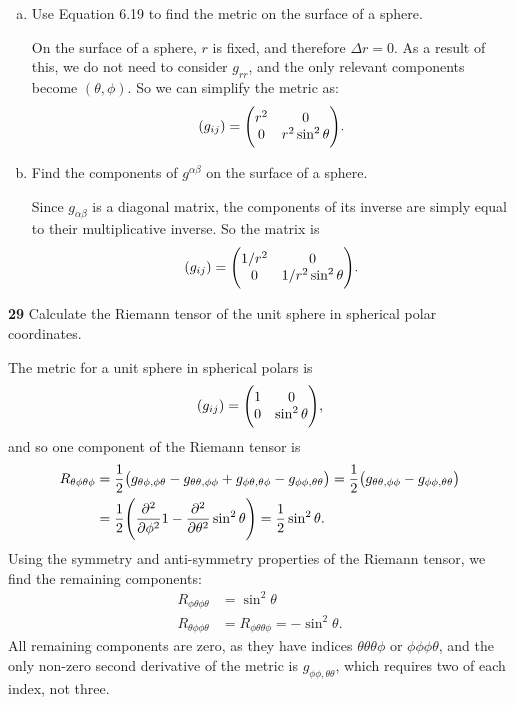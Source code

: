 \documentclass[gr-notes.tex]{subfiles}
\begin{document}
\begin{enumerate}[(a)]
\item Use Equation 6.19 to find the metric on the surface of a sphere.

On the surface of a sphere, $r$ is fixed, and therefore $\Delta r = 0$. As a result of this, we do not need to consider $g_{rr}$, and the only relevant components become $(\theta,\phi)$. So we can simplify the metric as:
%
\begin{displaymath}
  (g_{ij}) = \mqty(\dmat[0]{r^2,r^2\sin^2\theta}).
\end{displaymath}

\item Find the components of $g^{\alpha\beta}$ on the surface of a sphere.

Since $g_{\alpha\beta}$ is a diagonal matrix, the components of its inverse are simply equal to their multiplicative inverse. So the matrix is
%
\begin{displaymath}
  (g_{ij}) = \mqty(\dmat[0]{1/r^2,1/r^2\sin^2\theta}).
\end{displaymath}

\end{enumerate}


\textbf{29}
Calculate the Riemann tensor of the unit sphere in spherical polar coordinates.

The metric for a unit sphere in spherical polars is
%
\begin{displaymath}
  (g_{ij}) = \mqty(\dmat[0]{1,\sin^2\theta}),
\end{displaymath}
%
and so one component of the Riemann tensor is
%
\begin{align*}
  R_{\theta\phi\theta\phi} &=
  \frac{1}{2} \qty(
    g_{\theta\phi,\phi\theta} -
    g_{\theta\theta,\phi\phi} +
    g_{\phi\theta,\theta\phi} -
    g_{\phi\phi,\theta\theta}
  ) =
  \frac{1}{2} \qty(
    g_{\theta\theta,\phi\phi} -
    g_{\phi\phi,\theta\theta}
  )
  \\ &=
  \frac{1}{2} \qty(
    \pdv[2]{\phi}   1 -
    \pdv[2]{\theta} \sin^2\theta
  ) =
  \frac{1}{2} \sin^2\theta.
\end{align*}
%
Using the symmetry and anti-symmetry properties of the Riemann tensor, we find the remaining components:
%
\begin{align*}
  R_{\phi\theta\phi\theta} &=
  \sin^2\theta
  \\
  R_{\theta\phi\phi\theta} &=
  R_{\phi\theta\theta\phi} =
 -\sin^2\theta.
\end{align*}
%
All remaining components are zero, as they have indices $\theta\theta\theta\phi$ or $\phi\phi\phi\theta$, and the only non-zero second derivative of the metric is $g_{\phi\phi,\theta\theta}$, which requires two of each index, not three.
\end{document}
